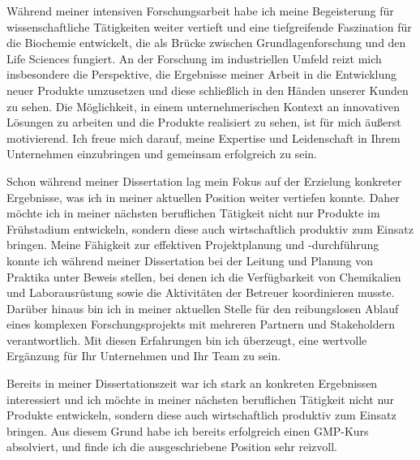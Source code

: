     {Während meiner intensiven Forschungsarbeit habe ich meine Begeisterung für wissenschaftliche Tätigkeiten weiter vertieft und eine tiefgreifende Faszination für die Biochemie entwickelt, die als Brücke zwischen Grundlagenforschung und den Life Sciences fungiert. An der Forschung im industriellen Umfeld reizt mich insbesondere die Perspektive, die Ergebnisse meiner Arbeit in die Entwicklung neuer Produkte umzusetzen und diese schließlich in den Händen unserer Kunden zu sehen. Die Möglichkeit, in einem unternehmerischen Kontext an innovativen Lösungen zu arbeiten und die Produkte realisiert zu sehen, ist für mich äußerst motivierend. Ich freue mich darauf, meine Expertise und Leidenschaft in Ihrem Unternehmen einzubringen und gemeinsam erfolgreich zu sein.}{}
    {Schon während meiner Dissertation lag mein Fokus auf der Erzielung konkreter Ergebnisse, was ich in meiner aktuellen Position weiter vertiefen konnte. Daher möchte ich in meiner nächsten beruflichen Tätigkeit nicht nur Produkte im Frühstadium entwickeln, sondern diese auch wirtschaftlich produktiv zum Einsatz bringen. Meine Fähigkeit zur effektiven Projektplanung und -durchführung konnte ich während meiner Dissertation bei der Leitung und Planung von Praktika unter Beweis stellen, bei denen ich die Verfügbarkeit von Chemikalien und Laborausrüstung sowie die Aktivitäten der Betreuer koordinieren musste. Darüber hinaus bin ich in meiner aktuellen Stelle für den reibungslosen Ablauf eines komplexen Forschungsprojekts mit mehreren Partnern und Stakeholdern verantwortlich. Mit diesen Erfahrungen bin ich überzeugt, eine wertvolle Ergänzung für Ihr Unternehmen und Ihr Team zu sein.
    \par }{}
    {Bereits in meiner Dissertationszeit war ich stark an konkreten Ergebnissen interessiert und ich möchte in meiner nächsten beruflichen Tätigkeit nicht nur Produkte entwickeln, sondern diese auch wirtschaftlich produktiv zum Einsatz bringen. Aus diesem Grund habe ich bereits erfolgreich einen GMP-Kurs absolviert, und finde ich die ausgeschriebene Position sehr reizvoll.\par }{}
